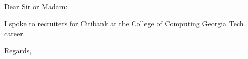 \documentclass{letter}
\begin{document}
\begin{letter}{}
\opening{Dear Sir or Madam:}

I spoke to recruiters for Citibank at the College of Computing Georgia Tech career.  
\closing{Regards,}
\end{letter}
\end{document}
